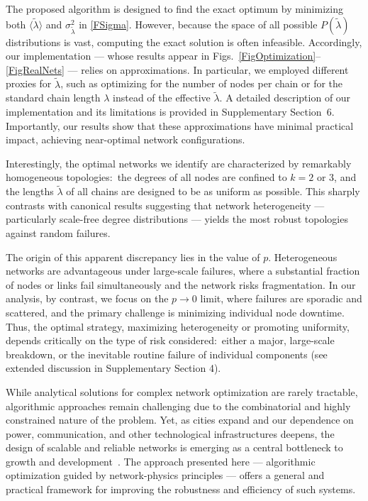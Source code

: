 \documentclass[oneside, a4paper, onecolumn, 11pt]{article}
\newcommand{\av}[1]{\langle #1 \rangle}
\begin{document}
\begin{refsection}
The proposed algorithm is designed to find the exact optimum by minimizing both $\av{\tilde \lambda}$ and $\sigma_{\tilde \lambda}^2$ in \eqref{FSigma}. However, because the space of all possible $P(\tilde \lambda)$ distributions is vast, computing the exact solution is often infeasible. Accordingly, our implementation — whose results appear in Figs.\ \ref{FigOptimization}–\ref{FigRealNets} — relies on approximations. In particular, we employed different proxies for $\tilde \lambda$, such as optimizing for the number of nodes per chain or for the standard chain length $\lambda$ instead of the effective $\tilde \lambda$. A detailed description of our implementation and its limitations is provided in Supplementary Section~6. Importantly, our results show that these approximations have minimal practical impact, achieving near-optimal network configurations. 

Interestingly, the optimal networks we identify are characterized by remarkably homogeneous topologies:\ the degrees of all nodes are confined to $k = 2$ or $3$, and the lengths $\tilde \lambda$ of all chains are designed to be as uniform as possible. This sharply contrasts with canonical results suggesting that network heterogeneity — particularly scale-free degree distributions — yields the most robust topologies against random failures. 

The origin of this apparent discrepancy lies in the value of $p$. Heterogeneous networks are advantageous under large-scale failures, where a substantial fraction of nodes or links fail simultaneously and the network risks fragmentation. In our analysis, by contrast, we focus on the $p \to 0$ limit, where failures are sporadic and scattered, and the primary challenge is minimizing individual node downtime. Thus, the optimal strategy, maximizing heterogeneity or promoting uniformity, depends critically on the type of risk considered:\ either a major, large-scale breakdown, or the inevitable routine failure of individual components (see extended discussion in Supplementary Section 4).

While analytical solutions for complex network optimization are rarely tractable, algorithmic approaches remain challenging due to the combinatorial and highly constrained nature of the problem. Yet, as cities expand and our dependence on power, communication, and other technological infrastructures deepens, the design of scalable and reliable networks is emerging as a central bottleneck to growth and development~\cite{lei2025privacy}. The approach presented here — algorithmic optimization guided by network-physics principles — offers a general and practical framework for improving the robustness and efficiency of such systems.  


\end{refsection}
\end{document}
